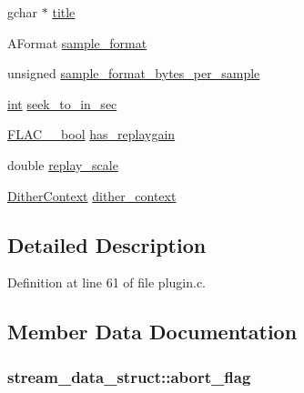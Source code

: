 \begin{DoxyCompactItemize}
\item 
gchar $\ast$ \hyperlink{structstream__data__struct_a9462e9113421cec64e9c5b966f4794ff}{title}
\item 
A\+Format \hyperlink{structstream__data__struct_a5504cfea12e06c513d7827cc3fed3e62}{sample\+\_\+format}
\item 
unsigned \hyperlink{structstream__data__struct_a242bcc66f0b52da3c8269f89a26e1189}{sample\+\_\+format\+\_\+bytes\+\_\+per\+\_\+sample}
\item 
\hyperlink{xmltok_8h_a5a0d4a5641ce434f1d23533f2b2e6653}{int} \hyperlink{structstream__data__struct_a82d947588a2803072a02951adc2ec603}{seek\+\_\+to\+\_\+in\+\_\+sec}
\item 
\hyperlink{ordinals_8h_a95103469f1cbd78b8cf250194985b34e}{F\+L\+A\+C\+\_\+\+\_\+bool} \hyperlink{structstream__data__struct_ab738985d3ef937973e317de0b95a433a}{has\+\_\+replaygain}
\item 
double \hyperlink{structstream__data__struct_a3f1a21ce18c80a1e104989e33f46e322}{replay\+\_\+scale}
\item 
\hyperlink{struct_dither_context}{Dither\+Context} \hyperlink{structstream__data__struct_a96f14f8d4d3c2fd9749b9a91a47a8f3d}{dither\+\_\+context}
\end{DoxyCompactItemize}


\subsection{Detailed Description}


Definition at line 61 of file plugin.\+c.



\subsection{Member Data Documentation}
\subsubsection[{\texorpdfstring{abort\+\_\+flag}{abort_flag}}]{ stream\+\_\+data\+\_\+struct\+::abort\+\_\+flag}\hypertarget{structstream__data__struct_af1f73ee70c6f8fedf9c081578c369685}{}\label{structstream__data__struct_af1f73ee70c6f8fedf9c081578c369685}


